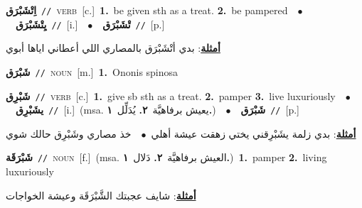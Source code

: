 \documentclass[10pt,a4paper,twoside]{article} %
\begin{document}
\begin{multicols}{2}
{{{{{{{{{\setlength\topsep{0pt}\textbf{\foreignlanguage{arabic}{اِتْشَبْرَق}}\ {\color{gray}\texttt{//}\color{black}}\ \textsc{verb}\ [c.]\ \textbf{1.}~be given sth as a treat.  \textbf{2.}~be pampered\ \ $\bullet$\ \ \setlength\topsep{0pt}\textbf{\foreignlanguage{arabic}{يِتْشَبْرَق}}\ {\color{gray}\texttt{//}\color{black}}\ [i.]\ \ $\bullet$\ \ \setlength\topsep{0pt}\textbf{\foreignlanguage{arabic}{تْشَبْرَق}}\ {\color{gray}\texttt{//}\color{black}}\ [p.]\  \begin{flushright}\color{gray}\foreignlanguage{arabic}{\textbf{\underline{\foreignlanguage{arabic}{أمثلة}}}: بدي أتْشَبْرَق بالمصاري اللي أعطاني اياها أبوي}\end{flushright}\color{black}} \vspace{2mm}

{\setlength\topsep{0pt}\textbf{\foreignlanguage{arabic}{شَبْرَق}}\ {\color{gray}\texttt{//}\color{black}}\ \textsc{noun}\ [m.]\ \textbf{1.}~Ononis spinosa\ 

{\setlength\topsep{0pt}\textbf{\foreignlanguage{arabic}{شَبْرِق}}\ {\color{gray}\texttt{//}\color{black}}\ \textsc{verb}\ [c.]\ \textbf{1.}~give sb sth as a treat.  \textbf{2.}~pamper  \textbf{3.}~live luxuriously\ \ $\bullet$\ \ \setlength\topsep{0pt}\textbf{\foreignlanguage{arabic}{يشَبْرِق}}\ {\color{gray}\texttt{//}\color{black}}\ [i.]\ \color{gray}(msa. \foreignlanguage{arabic}{يعيش برفاهيَّة}~\foreignlanguage{arabic}{\textbf{٢.}}  \foreignlanguage{arabic}{يُدَلِّل}~\foreignlanguage{arabic}{\textbf{١.}})\color{black}\ \ $\bullet$\ \ \setlength\topsep{0pt}\textbf{\foreignlanguage{arabic}{شَبْرَق}}\ {\color{gray}\texttt{//}\color{black}}\ [p.]\  \begin{flushright}\color{gray}\foreignlanguage{arabic}{\textbf{\underline{\foreignlanguage{arabic}{أمثلة}}}: بدي زلمة يشَبْرِقني يختي زهقت عيشة أهلي\ $\bullet$\ \  خذ مصاري وشَبْرِق حالك شوي}\end{flushright}\color{black}} \vspace{2mm}

{\setlength\topsep{0pt}\textbf{\foreignlanguage{arabic}{شَبْرَقَة}}\ {\color{gray}\texttt{//}\color{black}}\ \textsc{noun}\ [f.]\ \color{gray}(msa. \foreignlanguage{arabic}{العيش برفاهيَّة}~\foreignlanguage{arabic}{\textbf{٢.}}  \foreignlanguage{arabic}{دَلال}~\foreignlanguage{arabic}{\textbf{١.}})\color{black}\ \textbf{1.}~pamper  \textbf{2.}~living luxuriously\  \begin{flushright}\color{gray}\foreignlanguage{arabic}{\textbf{\underline{\foreignlanguage{arabic}{أمثلة}}}: شايف عجبتك الشَّبْرَقَة وعيشة الخواجات}\end{flushright}\color{black}} \vspace{2mm}

}}}}}}}}}
\end{multicols}
\end{document}
